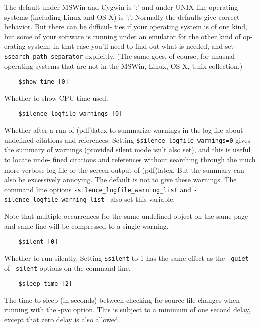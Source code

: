 The default under MSWin and Cygwin is ';'  and  under  UNIX-like
operating  systems  (including Linux and OS-X) is ':'.  Normally
the defaults give correct behavior.  But there can be  difficul-
ties  if  your operating system is of one kind, but some of your
software is running under an emulator for the other kind of  op-
erating  system;  in  that  case you'll need to find out what is
needed, and set \verb|$search_path_separator|  explicitly.   (The  same
goes,  of  course, for unusual operating systems that are not in
the MSWin, Linux, OS-X, Unix collection.)

\begin{verbatim}
	$show_time [0]
\end{verbatim}

Whether to show CPU time used.

\begin{verbatim}
	$silence_logfile_warnings [0]
\end{verbatim}

Whether after a run of (pdf)latex to summarize warnings  in  the log file about
undefined citations and references.  Setting \verb|$silence_logfile_warnings=0|
gives the summary of warnings (provided silent  mode isn't also set), and this
is useful to locate unde- fined citations and references  without  searching
through  the much  more  verbose log file or the screen output of (pdf)latex.
But the summary can also be excessively annoying.   The  default is  not  to
give these warnings.  The command line options
\verb|-silence_logfile_warning_list|  and
\verb|-silence_logfile_warning_list-| also set this variable.

Note  that multiple occurrences for the same undefined object on the same page
and same line will be compressed to a single warning.

\begin{verbatim}
	$silent [0]
\end{verbatim}

Whether  to run silently.  Setting \verb|$silent| to 1 has the same effect as
the \verb|-quiet| of \verb|-silent| options on the command line.

\begin{verbatim}
	$sleep_time [2]
\end{verbatim}

The time to sleep (in seconds) between checking for source  file changes when
running with the -pvc option.  This is subject to a minimum of one second
delay, except that zero delay is also  allowed.

